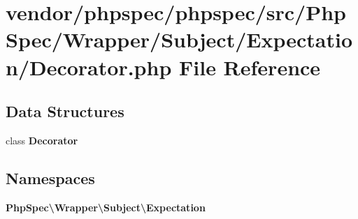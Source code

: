 \section{vendor/phpspec/phpspec/src/\+Php\+Spec/\+Wrapper/\+Subject/\+Expectation/\+Decorator.php File Reference}
\label{_decorator_8php}
\subsection*{Data Structures}
\begin{DoxyCompactItemize}
\item 
class {\bf Decorator}
\end{DoxyCompactItemize}
\subsection*{Namespaces}
\begin{DoxyCompactItemize}
\item 
 {\bf Php\+Spec\textbackslash{}\+Wrapper\textbackslash{}\+Subject\textbackslash{}\+Expectation}
\end{DoxyCompactItemize}
